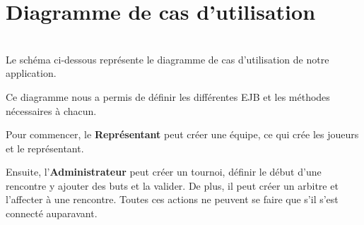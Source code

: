 \documentclass[10pt]{report}
\begin{document}
\section{Diagramme de cas d'utilisation}
~\\
Le schéma ci-dessous représente le diagramme de cas d'utilisation de notre application. \\
	\begin{figure}[hp]
	      \begin{center}
	      \end{center}
	\end{figure}

Ce diagramme nous a permis de définir les différentes EJB et les méthodes nécessaires à chacun.

Pour commencer, le \textbf{Représentant} peut créer une équipe, ce qui crée les joueurs et le représentant.

Ensuite, l'\textbf{Administrateur} peut créer un tournoi, définir le début d'une rencontre y ajouter des buts et la valider.
De plus, il peut créer un arbitre et l'affecter à une rencontre.
Toutes ces actions ne peuvent se faire que s'il s'est connecté auparavant.
\end{document}
